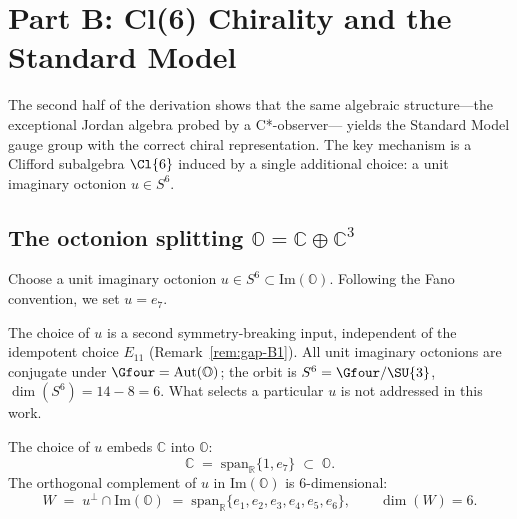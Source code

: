 
\section{Part B: Cl(6) Chirality and the Standard Model}\label{sec:chirality}

The second half of the derivation shows that the same algebraic
structure---the exceptional Jordan algebra probed by a C*-observer---
yields the Standard Model gauge group with the correct chiral
representation.  The key mechanism is a Clifford subalgebra $\Cl{6}$
induced by a single additional choice: a unit imaginary octonion
$u\in S^6$.

\subsection{The octonion splitting \texorpdfstring{$\mathbb{O} = \mathbb{C} \oplus \mathbb{C}^3$}{O = C + C3}}\label{sec:oct-split}

Choose a unit imaginary octonion $u\in S^6 \subset \mathrm{Im}(\mathbb{O})$.
Following the Fano convention, we set $u = e_7$.

\begin{remark}\label{rem:gap-B2}
The choice of $u$ is a second symmetry-breaking input, independent
of the idempotent choice $E_{11}$ (Remark~\ref{rem:gap-B1}).
All unit imaginary octonions are conjugate under
$\Gfour = \mathrm{Aut}(\mathbb{O})$; the orbit is
$S^6 = \Gfour/\SU{3}$, $\dim(S^6) = 14 - 8 = 6$.
What selects a particular $u$ is not addressed in this work.
\end{remark}

The choice of $u$ embeds $\mathbb{C}$ into $\mathbb{O}$:
\begin{equation}\label{eq:C-embed}
  \mathbb{C}
  \;=\; \mathrm{span}_\mathbb{R}\{1, e_7\}
  \;\subset\; \mathbb{O}.
\end{equation}
The orthogonal complement of $u$ in $\mathrm{Im}(\mathbb{O})$
is 6-dimensional:
\begin{equation}\label{eq:W-def}
  W \;=\; u^\perp \cap \mathrm{Im}(\mathbb{O})
  \;=\; \mathrm{span}_\mathbb{R}\{e_1,e_2,e_3,e_4,e_5,e_6\},
  \qquad \dim(W) = 6.
\end{equation}

